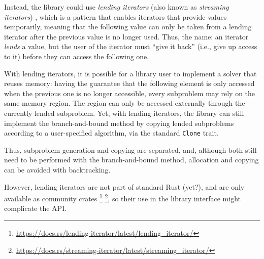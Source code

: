 Instead, the library could use \emph{lending iterators}
(also known as \emph{streaming iterators}) \cite{LendingIterator},
which is a pattern that enables iterators that provide values temporarily,
meaning that the following value can only be taken from a lending iterator after the previous
value is no longer used. Thus, the name: an iterator \emph{lends} a value,
but the user of the iterator must ``give it back'' (i.e., give up access to it)
before they can access the following one.

With lending iterators, it is possible for a library user to implement a solver that
reuses memory: having the guarantee that the following element is only accessed when
the previous one is no longer accessible, every subproblem may rely on the same memory
region. The region can only be accessed externally through the currently lended subproblem.
Yet, with lending iterators, the library can still implement the branch-and-bound method
by copying lended subproblems according to a user-specified algorithm, via the standard
\texttt{Clone} trait.

Thus, subproblem generation and copying are separated, and, although both still need to be
performed with the branch-and-bound method, allocation and copying can be avoided with
backtracking.

However, lending iterators are not part of standard Rust (yet?), and are only available as
community crates
\footnote{\url{https://docs.rs/lending-iterator/latest/lending_iterator/}}
\footnote{\url{https://docs.rs/streaming-iterator/latest/streaming_iterator/}},
so their use in the library interface might complicate the API.
